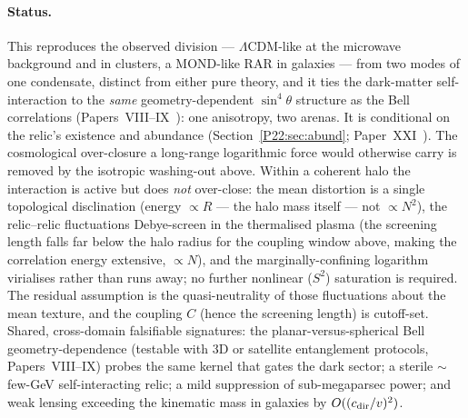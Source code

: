 \documentclass[11pt,a4paper]{article}
\theoremstyle{definition}\newtheorem{definition}[theorem]{Definition}
\begin{document}
\paragraph{Status.} This reproduces the observed division --- $\Lambda$CDM-like at the
microwave background and in clusters, a MOND-like RAR in galaxies --- from two modes of one
condensate, distinct from either pure theory, and it ties the dark-matter self-interaction
to the \emph{same} geometry-dependent $\sin^4\theta$ structure as the Bell correlations
(Papers~VIII--IX~\cite{Paper8,Paper9}): one anisotropy, two arenas. It is conditional on the
relic's existence and abundance (Section~\ref{P22:sec:abund}; Paper~XXI~\cite{Paper21}). The
cosmological over-closure a long-range logarithmic force would otherwise carry is removed by
the isotropic washing-out above. Within a coherent halo the interaction is active but does
\emph{not} over-close: the mean distortion is a single topological disclination (energy
$\propto R$ --- the halo mass itself --- not $\propto N^2$), the relic--relic fluctuations
Debye-screen in the thermalised plasma (the screening length falls far below the halo radius
for the coupling window above, making the correlation energy extensive, $\propto N$), and the
marginally-confining logarithm virialises rather than runs away; no further nonlinear ($S^2$)
saturation is required. The residual assumption is the quasi-neutrality of those fluctuations
about the mean texture, and the coupling $C$ (hence the screening length) is cutoff-set. Shared, cross-domain
falsifiable signatures: the planar-versus-spherical Bell geometry-dependence (testable with
$3$D or satellite entanglement protocols, Papers~VIII--IX) probes the same kernel that gates
the dark sector; a sterile $\sim$few-GeV self-interacting relic; a mild suppression of
sub-megaparsec power; and weak lensing exceeding the kinematic mass in galaxies by
$O((c_{\rm dir}/v)^2)$.
\end{document}
